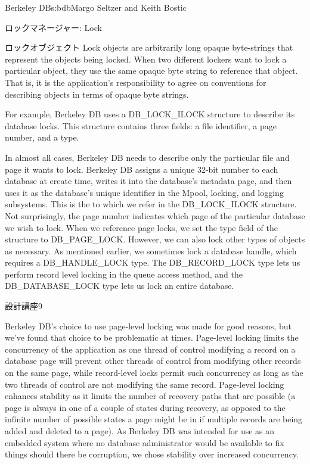 \begin{aosachapter}{Berkeley DB}{s:bdb}{Margo Seltzer and Keith Bostic}
\begin{aosasect1}{ロックマネージャー: Lock}
\begin{aosasect2}{ロックオブジェクト}
Lock objects are arbitrarily long opaque byte-strings that represent
the objects being locked. When two different lockers want to lock a
particular object, they use the same opaque byte string to reference
that object.  That is, it is the application's responsibility to agree
on conventions for describing objects in terms of opaque byte strings.

For example, Berkeley DB uses a DB\_LOCK\_ILOCK structure to describe
its database locks. This structure contains three fields: a file
identifier, a page number, and a type.

In almost all cases, Berkeley DB needs to describe only the particular
file and page it wants to lock. Berkeley DB assigns a unique 32-bit
number to each database at create time, writes it into the database's
metadata page, and then uses it as the database's unique identifier
in the Mpool, locking, and logging subsystems. This is the
 to which we refer in the DB\_LOCK\_ILOCK structure. Not
surprisingly, the page number indicates which page of the particular
database we wish to lock.  When we reference page locks, we set the
type field of the structure to DB\_PAGE\_LOCK\@.  However, we can also
lock other types of objects as necessary. As mentioned earlier, we
sometimes lock a database handle, which requires a DB\_HANDLE\_LOCK
type. The DB\_RECORD\_LOCK type lets us perform record level locking
in the queue access method, and the DB\_DATABASE\_LOCK type lets us
lock an entire database. 
\hspace{-.5cm}
\begin{aosabox}{設計講座9}

Berkeley DB's choice to use page-level locking was made for good
reasons, but we've found that choice to be problematic at times. Page-level locking
limits the concurrency of the application as one thread of control
modifying a record on a database page will prevent other threads of
control from modifying other records on the same page, while
record-level locks permit such concurrency as long as the two threads
of control are not modifying the same record.  Page-level locking
enhances stability as it limits the number of recovery paths that are
possible (a page is always in one of a couple of states during
recovery, as opposed to the infinite number of possible states a page
might be in if multiple records are being added and deleted to a
page). As Berkeley DB was intended for use as an embedded system where
no database administrator would be available to fix things should
there be corruption, we chose stability over increased concurrency.


\end{aosabox}
\end{aosasect2}
\end{aosasect1}
\end{aosachapter}
